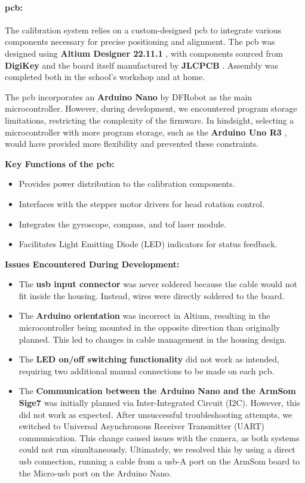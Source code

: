\paragraph{\acrshort{pcb}:}
The calibration system relies on a custom-designed \acrshort{pcb} to integrate various components necessary for precise positioning and alignment. The \acrshort{pcb} was designed using \textbf{Altium Designer 22.11.1} \cite{altium_designer_22}, with components sourced from \textbf{DigiKey} \cite{digikey} and the board itself manufactured by \textbf{JLCPCB} \cite{jlcpcb}. Assembly was completed both in the school’s workshop and at home.

The \acrshort{pcb} incorporates an \textbf{Arduino Nano} by DFRobot \cite{arduino_nano_dfrobot} as the main microcontroller. However, during development, we encountered program storage limitations, restricting the complexity of the firmware. In hindsight, selecting a microcontroller with more program storage, such as the \textbf{Arduino Uno R3} \cite{arduino_uno_dfrobot}, would have provided more flexibility and prevented these constraints.

\textbf{Key Functions of the \acrshort{pcb}:}
\begin{itemize}
	\item Provides power distribution to the calibration components.
	\item Interfaces with the stepper motor drivers for head rotation control.
	\item Integrates the gyroscope, compass, and \acrshort{tof} laser module.
	\item Facilitates Light Emitting Diode (LED) indicators for status feedback.
\end{itemize}

\textbf{Issues Encountered During Development:}
\begin{itemize}
	\item The \textbf{\acrshort{usb} input connector} was never soldered because the cable would not fit inside the housing. Instead, wires were directly soldered to the board.
	\item The \textbf{Arduino orientation} was incorrect in Altium, resulting in the microcontroller being mounted in the opposite direction than originally planned. This led to changes in cable management in the housing design.
	\item The \textbf{LED on/off switching functionality} did not work as intended, requiring two additional manual connections to be made on each \acrshort{pcb}.
	\item The \textbf{Communication between the Arduino Nano \cite{arduino_nano_dfrobot} and the ArmSom Sige7 \cite{armsom_sige7}} was initially planned via Inter-Integrated Circuit (I2C). However, this did not work as expected. After unsuccessful troubleshooting attempts, we switched to Universal Asynchronous Receiver Transmitter (UART) communication. This change caused issues with the camera, as both systems could not run simultaneously. Ultimately, we resolved this by using a direct \acrshort{usb} connection, running a cable from a \acrshort{usb}-A port on the ArmSom board to the Micro-\acrshort{usb} port on the Arduino Nano.
\end{itemize}

